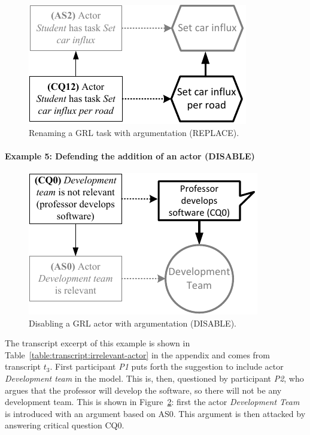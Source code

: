 \begin{figure}[b]
\centering
\includegraphics[]{img/fig_example_rename.pdf}
\caption{Renaming a GRL task with argumentation (\textsf{REPLACE)}.}
\label{fig:examples:clarification}
\end{figure}

\paragraph{Example 5: Defending the addition of an actor (\textsf{DISABLE)}}

\begin{figure}[t]
\centering
\includegraphics[]{img/reinstate1.pdf}
\caption{Disabling a GRL actor with argumentation (\textsf{DISABLE)}.}
\label{fig:examples:relevant-actor}
\end{figure}

The transcript excerpt of this example is shown in Table~\ref{table:transcript:irrelevant-actor} in the appendix and comes from transcript $t_3$. First participant \emph{P1} puts forth the suggestion to include actor \emph{Development team} in the model. This is, then, questioned by participant \emph{P2}, who argues that the professor will develop the software, so there will not be any development team. This is shown in Figure~\ref{fig:examples:relevant-actor}: first the actor \emph{Development Team} is introduced with an argument based on AS0. This argument is then attacked by answering critical question CQ0. 

